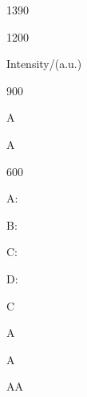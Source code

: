 \documentclass[a4paper,portrait,12pt]{article}
\begin{document}
1390





1200





\begin{flushleft}
Intensity/(a.u.)
\end{flushleft}





900





\begin{flushleft}
A
\end{flushleft}


\begin{flushleft}
A
\end{flushleft}





600





\begin{flushleft}
A:
\end{flushleft}


\begin{flushleft}
B:
\end{flushleft}


\begin{flushleft}
C:
\end{flushleft}


\begin{flushleft}
D:
\end{flushleft}





\begin{flushleft}
C
\end{flushleft}





\begin{flushleft}
A
\end{flushleft}


\begin{flushleft}
A
\end{flushleft}





\begin{flushleft}
AA
\end{flushleft}
\end{document}
